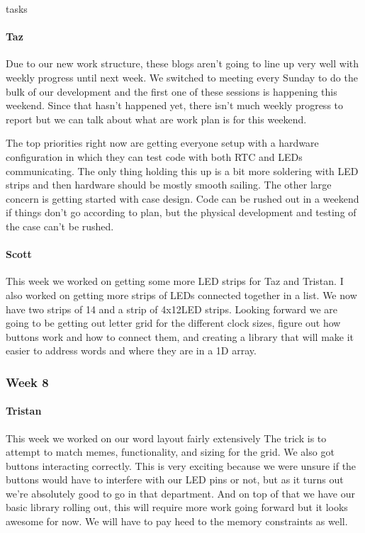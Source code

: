 tasks\documentclass[onecolumn, draftclsnofoot,10pt, compsoc]{IEEEtran}
\begin{document}
\paragraph{Taz}
Due to our new work structure, these blogs aren't going to line up very well with weekly progress until next week. We switched to meeting every Sunday to do the bulk of our development and the first one of these sessions is happening this weekend. Since that hasn't happened yet, there isn't much weekly progress to report but we can talk about what are work plan is for this weekend.

The top priorities right now are getting everyone setup with a hardware configuration in which they can test code with both RTC and LEDs communicating. The only thing holding this up is a bit more soldering with LED strips and then hardware should be mostly smooth sailing. The other large concern is getting started with case design. Code can be rushed out in a weekend if things don't go according to plan, but the physical development and testing of the case can't be rushed.
\paragraph{Scott}
This week we worked on getting some more LED strips for Taz and Tristan. I also worked on getting more strips of LEDs connected together in a list. We now have two strips of 14 and a strip of 4x12LED strips. Looking forward we are going to be getting out letter grid for the different clock sizes, figure out how buttons work and how to connect them, and creating a library that will make it easier to address words and where they are in a 1D array.
\subsubsection{Week 8}
\paragraph{Tristan}
This week we worked on our word layout fairly extensively The trick is to attempt to match memes, functionality, and sizing for the grid. We also got buttons interacting correctly. This is very exciting because we were unsure if the buttons would have to interfere with our LED pins or not, but as it turns out we're absolutely good to go in that department. And on top of that we have our basic library rolling out, this will require more work going forward but it looks awesome for now. We will have to pay heed to the memory constraints as well.
\end{document}
